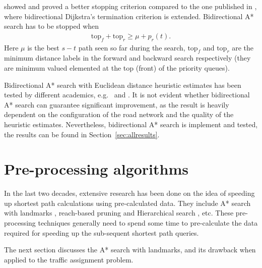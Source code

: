 \citet{GoldbergEPP} showed and proved a better stopping criterion compared to the one published in \citet{Pohl},
where bidirectional Dijkstra's termination criterion is extended.
Bidirectional A* search has to be stopped when
\begin{align}
    \text{top}_f + \text{top}_r \geq \mu + p_r(t).
\end{align}
Here $\mu$ is the best $s-t$ path seen so far during the search,
$\text{top}_f$ and $\text{top}_r$ are the minimum distance labels in the forward and backward search respectively (they are minimum valued elemented at the top (front) of the priority queues).

Bidirectional A* search with Euclidean distance heuristic estimates has been tested by different academics, e.g.\ \citet{Klunder} and \citet{Goldberg05}.
It is not evident whether bidirectional A* search can guarantee significant improvement,
as the result is heavily dependent on the configuration of the road network and the quality of the heuristic estimates.
Nevertheless, bidirectional A* search is implement and tested, the results can be found in Section~\ref{sec:allresults}.

\section{Pre-processing algorithms}
In the last two decades,
extensive research has been done on the idea of speeding up shortest path calculations using pre-calculated data.
They include A* search with landmarks \citep{GoldbergLandmarks}, reach-based pruning \citep{Goldberg} and Hierarchical search \citep{Ertl1998, Pearson}, etc.
These pre-processing techniques generally need to spend some time to pre-calculate the data required for speeding up the sub-sequent shortest path queries.

The next section discusses the A* search with landmarks,
and its drawback when applied to the traffic assignment problem.

